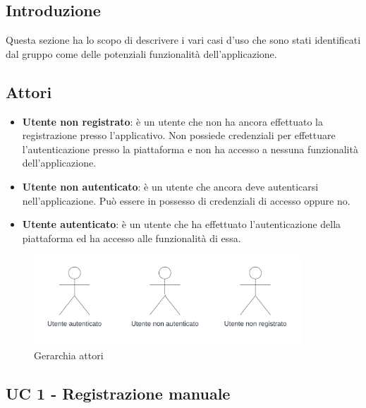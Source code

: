 \subsection{Introduzione}
Questa sezione ha lo scopo di descrivere i vari casi d'uso che sono stati identificati dal gruppo \teamname{} come delle potenziali funzionalità dell'applicazione.

\subsection{Attori}
\begin{itemize}
    \item \textbf{Utente non registrato}: 
    è un utente che non ha ancora effettuato la registrazione presso l'applicativo. 
    Non possiede credenziali per effettuare l'autenticazione presso la piattaforma e non ha accesso a nessuna funzionalità dell'applicazione.
    \item \textbf{Utente non autenticato}: 
    è un utente che ancora deve autenticarsi nell'applicazione. Può essere in possesso di credenziali di accesso oppure no.
    \item \textbf{Utente autenticato}:
    è un utente che ha effettuato l'autenticazione della piattaforma ed ha accesso alle funzionalità di essa.
\end{itemize}

\begin{figure}[!h]
    \includegraphics[width=10cm]{sezioni/Images/Actors.png}
    \centering
    \caption{Gerarchia attori}
\end{figure}
\newpage
    
\subsection{UC 1 - Registrazione manuale}

